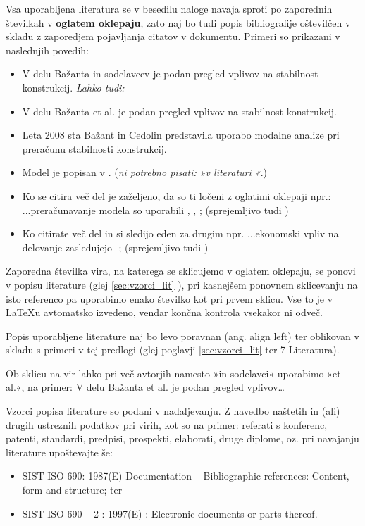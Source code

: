 Vsa uporabljena literatura se v besedilu naloge navaja sproti po zaporednih številkah v \textbf{oglatem oklepaju}, zato naj bo tudi popis bibliografije oštevilčen v skladu z zaporedjem pojavljanja citatov v dokumentu. Primeri so prikazani v naslednjih povedih:
\begin{itemize}
	\item V delu Bažanta in sodelavcev \cite{bazant_1991} je podan pregled 
	vplivov na stabilnost konstrukcij. \emph{Lahko tudi:}
	\item V delu Bažanta et al. \cite{bazant_1991} je podan pregled vplivov na 
	stabilnost konstrukcij.
	\item Leta 2008 sta Bažant in Cedolin \cite{Bazant_2008} predstavila 
	uporabo modalne analize pri pre\-ra\-ču\-nu stabilnosti konstrukcij.
	\item Model je popisan v \cite{Doe_1991}. (\emph{ni potrebno pisati: »v 
	literaturi \cite{Doe_1991}«}.)
	\item Ko se citira več del je zaželjeno, da so ti ločeni z oglatimi 
	oklepaji npr.:  ...preračunavanje modela so uporabili \cite{bazant_1991}, 
	\cite{Doe_1991}, \cite{Bazant_2008}; (sprejemljivo tudi 
	\cite{bazant_1991,Doe_1991,Bazant_2008}) 
	\item Ko citirate več del in si sledijo eden za drugim npr. ...ekonomski 
	vpliv na delovanje zasledujejo \cite{bazant_1991}-\cite{Bazant_2008}; 
	(sprejemljivo tudi \cite{bazant_1991, stropnik_1997, 
	Doe_1991,Loukides_2020, Bazant_2008})
\end{itemize}

Zaporedna številka vira, na katerega se sklicujemo v oglatem oklepaju, se ponovi v popisu literature (glej \ref{sec:vzorci_lit} ), pri kasnejšem ponovnem sklicevanju na isto referenco pa uporabimo enako številko kot pri prvem sklicu. Vse to je v \LaTeX u avtomatsko izvedeno, vendar končna kontrola vsekakor ni odveč.

Popis uporabljene literature naj bo levo poravnan (ang. align left) ter 
oblikovan v skladu s primeri v tej predlogi (glej poglavji \ref{sec:vzorci_lit} 
 ter 7 Literatura).

Ob sklicu na vir lahko pri več avtorjih namesto »in sodelavci« uporabimo »et al.«, na primer: V delu Bažanta et al. \cite{bazant_1991} je podan pregled vplivov\ldots

Vzorci popisa literature so podani v nadaljevanju. Z navedbo naštetih in (ali) drugih ustreznih podatkov pri virih, kot so na primer: referati s konferenc, patenti, standardi, predpisi, prospekti, elaborati, druge diplome, oz. pri navajanju literature upoštevajte še:
\begin{itemize}
\item SIST ISO 690: 1987(E) Documentation – Bibliographic references: Content, form and structure; ter
\item SIST ISO 690 – 2 : 1997(E) : Electronic documents or parts thereof.
\end{itemize}


